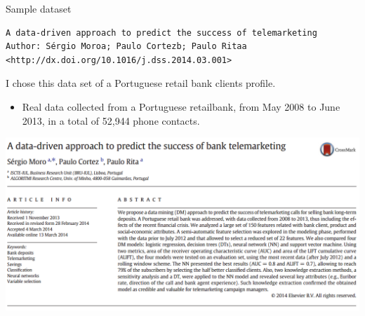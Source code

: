 \documentclass[
  10pt,
  ignorenonframetext,
  serif]{beamer}
\providecommand{\tightlist}{%
  \setlength{\itemsep}{0pt}\setlength{\parskip}{0pt}}
\begin{document}
\begin{frame}[fragile]{Sample dataset}
\protect\hypertarget{sample-dataset}{}
\begin{verbatim}
A data-driven approach to predict the success of telemarketing
Author: Sérgio Moroa; Paulo Cortezb; Paulo Ritaa
<http://dx.doi.org/10.1016/j.dss.2014.03.001>
\end{verbatim}

I chose this data set of a Portuguese retail bank clients profile.

\begin{itemize}
\tightlist
\item
  Real data collected from a Portuguese retailbank, from May 2008 to
  June 2013, in a total of 52,944 phone contacts.
\end{itemize}

\begin{center}\includegraphics[width=0.45\linewidth]{imgs/2017/sample-bank-data} \end{center}
\end{frame}
\end{document}
